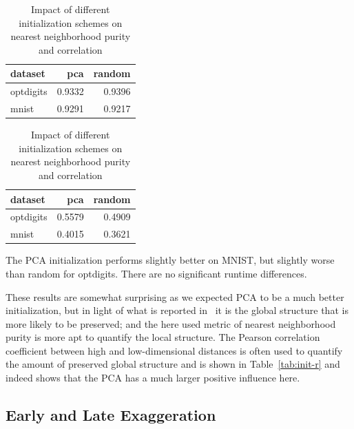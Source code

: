 \begin{table}[tb]
  \begin{subtable}{\linewidth}
    \centering
    \begin{tabular}{lrr}
      \toprule
  dataset & pca & random\\ \midrule
  optdigits & \num{0.9332} & \num{0.9396} \\
  mnist & \num{0.9291} & \num{0.9217} \\
      \bottomrule
    \end{tabular}
    \caption{Nearest neighborhood purity}
    \label{tab:init-knn}
  \end{subtable}
  \par\bigskip
  \begin{subtable}{\linewidth}
    \centering
    \begin{tabular}{lrr}
      \toprule
      dataset & pca & random\\ \midrule
optdigits & \num{0.5579} & \num{0.4909} \\
mnist & \num{0.4015} & \num{0.3621} \\
\bottomrule
    \end{tabular}
    \caption{Average Pearson correlation coefficient between high and low-dimensional distances}
    \label{tab:init-r}
  \end{subtable}
  \caption{Impact of different initialization schemes on nearest neighborhood purity and correlation}
  \label{tab:init}
\end{table}

The PCA initialization performs slightly better on MNIST, but slightly worse
than random for optdigits. There are no significant runtime differences.

These results are somewhat surprising as we expected PCA to be a much better
initialization, but in light of what is reported in~\cite{umap_rebuttal} it is
the global structure that is more likely to be preserved; and the here used
metric of nearest neighborhood purity is more apt to quantify the local
structure. The Pearson correlation coefficient between high and low-dimensional
distances is often used to quantify the amount of preserved global structure
and is shown in Table~\ref{tab:init-r} and indeed shows that the PCA has a much
larger positive influence here.

\subsection{Early and Late Exaggeration}


